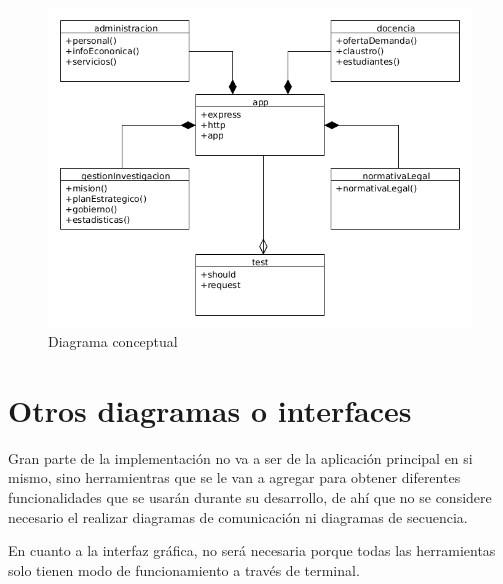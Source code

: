 \begin{figure}[!ht]
  \begin{center}
  \includegraphics[width=1\textwidth]{../images/diagrama_conceptual.png}
  \caption{Diagrama conceptual}
  \label{fig:diagrama_conceptual}
  \end{center}
\end{figure}

\section{Otros diagramas o interfaces}

Gran parte de la implementación no va a ser de la aplicación principal en si mismo, sino herramientras que se le van a agregar para obtener diferentes funcionalidades que se usarán durante su desarrollo, de ahí que no se considere necesario el realizar diagramas de comunicación ni diagramas de secuencia.

\bigskip
En cuanto a la interfaz gráfica, no será necesaria porque todas las herramientas solo tienen modo de funcionamiento a través de terminal.